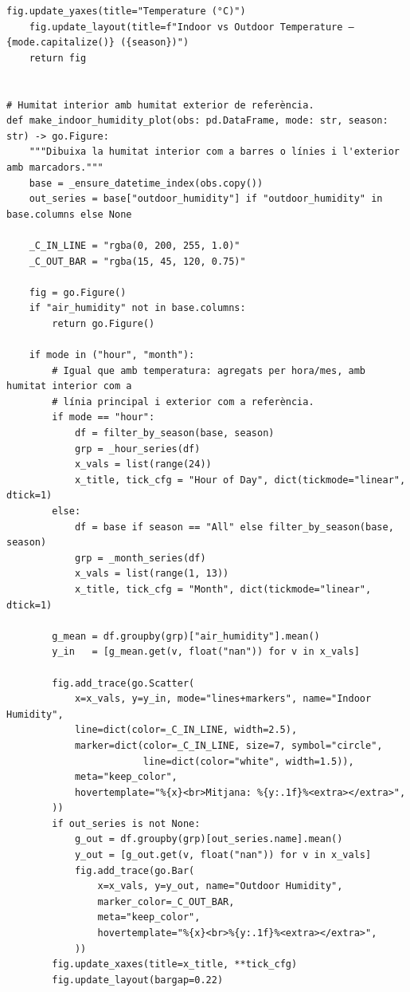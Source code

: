 \documentclass[10pt,a4paper]{article}
\begin{document}
\begin{lstlisting}[style=studioPython,caption={backend/grafics/thermal.py},label={lst:backend-grafics-thermal-py}]
    fig.update_yaxes(title="Temperature (°C)")
    fig.update_layout(title=f"Indoor vs Outdoor Temperature – {mode.capitalize()} ({season})")
    return fig


# Humitat interior amb humitat exterior de referència.
def make_indoor_humidity_plot(obs: pd.DataFrame, mode: str, season: str) -> go.Figure:
    """Dibuixa la humitat interior com a barres o línies i l'exterior amb marcadors."""
    base = _ensure_datetime_index(obs.copy())
    out_series = base["outdoor_humidity"] if "outdoor_humidity" in base.columns else None

    _C_IN_LINE = "rgba(0, 200, 255, 1.0)"
    _C_OUT_BAR = "rgba(15, 45, 120, 0.75)"

    fig = go.Figure()
    if "air_humidity" not in base.columns:
        return go.Figure()

    if mode in ("hour", "month"):
        # Igual que amb temperatura: agregats per hora/mes, amb humitat interior com a
        # línia principal i exterior com a referència.
        if mode == "hour":
            df = filter_by_season(base, season)
            grp = _hour_series(df)
            x_vals = list(range(24))
            x_title, tick_cfg = "Hour of Day", dict(tickmode="linear", dtick=1)
        else:
            df = base if season == "All" else filter_by_season(base, season)
            grp = _month_series(df)
            x_vals = list(range(1, 13))
            x_title, tick_cfg = "Month", dict(tickmode="linear", dtick=1)

        g_mean = df.groupby(grp)["air_humidity"].mean()
        y_in   = [g_mean.get(v, float("nan")) for v in x_vals]

        fig.add_trace(go.Scatter(
            x=x_vals, y=y_in, mode="lines+markers", name="Indoor Humidity",
            line=dict(color=_C_IN_LINE, width=2.5),
            marker=dict(color=_C_IN_LINE, size=7, symbol="circle",
                        line=dict(color="white", width=1.5)),
            meta="keep_color",
            hovertemplate="%{x}<br>Mitjana: %{y:.1f}%<extra></extra>",
        ))
        if out_series is not None:
            g_out = df.groupby(grp)[out_series.name].mean()
            y_out = [g_out.get(v, float("nan")) for v in x_vals]
            fig.add_trace(go.Bar(
                x=x_vals, y=y_out, name="Outdoor Humidity",
                marker_color=_C_OUT_BAR,
                meta="keep_color",
                hovertemplate="%{x}<br>%{y:.1f}%<extra></extra>",
            ))
        fig.update_xaxes(title=x_title, **tick_cfg)
        fig.update_layout(bargap=0.22)


\end{lstlisting}
\end{document}
